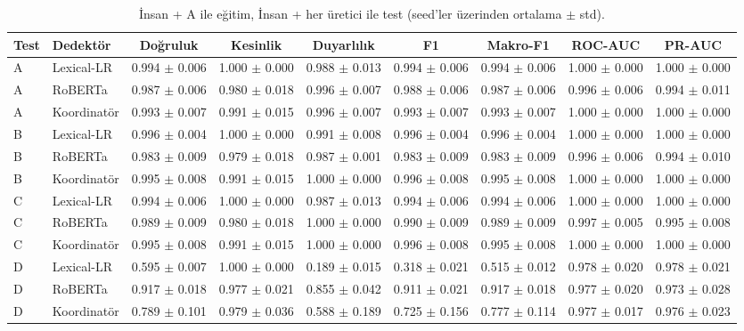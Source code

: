 \begin{table}[t]
\centering
\footnotesize
\caption{İnsan + A ile eğitim, İnsan + her üretici ile test (seed'ler üzerinden ortalama $\pm$ std).}
\label{tab:required}
\begin{tabular}{llccccccc}
\toprule
Test & Dedektör & Doğruluk & Kesinlik & Duyarlılık & F1 & Makro-F1 & ROC-AUC & PR-AUC \\
\midrule
A & Lexical-LR & 0.994 $\pm$ 0.006 & 1.000 $\pm$ 0.000 & 0.988 $\pm$ 0.013 & 0.994 $\pm$ 0.006 & 0.994 $\pm$ 0.006 & 1.000 $\pm$ 0.000 & 1.000 $\pm$ 0.000 \\
A & RoBERTa & 0.987 $\pm$ 0.006 & 0.980 $\pm$ 0.018 & 0.996 $\pm$ 0.007 & 0.988 $\pm$ 0.006 & 0.987 $\pm$ 0.006 & 0.996 $\pm$ 0.006 & 0.994 $\pm$ 0.011 \\
A & Koordinatör & 0.993 $\pm$ 0.007 & 0.991 $\pm$ 0.015 & 0.996 $\pm$ 0.007 & 0.993 $\pm$ 0.007 & 0.993 $\pm$ 0.007 & 1.000 $\pm$ 0.000 & 1.000 $\pm$ 0.000 \\
B & Lexical-LR & 0.996 $\pm$ 0.004 & 1.000 $\pm$ 0.000 & 0.991 $\pm$ 0.008 & 0.996 $\pm$ 0.004 & 0.996 $\pm$ 0.004 & 1.000 $\pm$ 0.000 & 1.000 $\pm$ 0.000 \\
B & RoBERTa & 0.983 $\pm$ 0.009 & 0.979 $\pm$ 0.018 & 0.987 $\pm$ 0.001 & 0.983 $\pm$ 0.009 & 0.983 $\pm$ 0.009 & 0.996 $\pm$ 0.006 & 0.994 $\pm$ 0.010 \\
B & Koordinatör & 0.995 $\pm$ 0.008 & 0.991 $\pm$ 0.015 & 1.000 $\pm$ 0.000 & 0.996 $\pm$ 0.008 & 0.995 $\pm$ 0.008 & 1.000 $\pm$ 0.000 & 1.000 $\pm$ 0.000 \\
C & Lexical-LR & 0.994 $\pm$ 0.006 & 1.000 $\pm$ 0.000 & 0.987 $\pm$ 0.013 & 0.994 $\pm$ 0.006 & 0.994 $\pm$ 0.006 & 1.000 $\pm$ 0.000 & 1.000 $\pm$ 0.000 \\
C & RoBERTa & 0.989 $\pm$ 0.009 & 0.980 $\pm$ 0.018 & 1.000 $\pm$ 0.000 & 0.990 $\pm$ 0.009 & 0.989 $\pm$ 0.009 & 0.997 $\pm$ 0.005 & 0.995 $\pm$ 0.008 \\
C & Koordinatör & 0.995 $\pm$ 0.008 & 0.991 $\pm$ 0.015 & 1.000 $\pm$ 0.000 & 0.996 $\pm$ 0.008 & 0.995 $\pm$ 0.008 & 1.000 $\pm$ 0.000 & 1.000 $\pm$ 0.000 \\
D & Lexical-LR & 0.595 $\pm$ 0.007 & 1.000 $\pm$ 0.000 & 0.189 $\pm$ 0.015 & 0.318 $\pm$ 0.021 & 0.515 $\pm$ 0.012 & 0.978 $\pm$ 0.020 & 0.978 $\pm$ 0.021 \\
D & RoBERTa & 0.917 $\pm$ 0.018 & 0.977 $\pm$ 0.021 & 0.855 $\pm$ 0.042 & 0.911 $\pm$ 0.021 & 0.917 $\pm$ 0.018 & 0.977 $\pm$ 0.020 & 0.973 $\pm$ 0.028 \\
D & Koordinatör & 0.789 $\pm$ 0.101 & 0.979 $\pm$ 0.036 & 0.588 $\pm$ 0.189 & 0.725 $\pm$ 0.156 & 0.777 $\pm$ 0.114 & 0.977 $\pm$ 0.017 & 0.976 $\pm$ 0.023 \\

\end{tabular}
\end{table}

